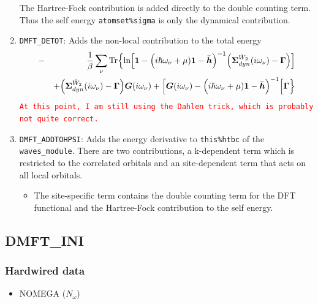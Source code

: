 \documentclass[11pt,a4paper]{report}
\newcommand{\petertt}[1]{\textcolor{red}{\texttt{#1}}}
\begin{document}
\begin{enumerate}
    The Hartree-Fock contribution is added directly to the double
  counting term. Thus the self energy \verb|atomset%sigma| is only
  the dynamical contribution.
%
\item \verb|DMFT_DETOT|: Adds the non-local contribution to the total energy
\begin{eqnarray}
&-&\frac{1}{\beta}\sum_\nu\mathrm{Tr}\Bigl\lbrace
\ln\Bigl[
\bm{1}-
\Bigl(i\hbar\omega_\nu+\mu)\bm{1}-\bar{\bm{h}}\Bigr)^{-1}
\Bigl(
\bm{\Sigma}^{\hat{W}_2}_{dyn}(i\omega_\nu)-\bm{\Gamma}\Bigr)
\Bigr]
\nonumber\\&&
+\Bigl(\bm{\Sigma}^{\hat{W}_2}_{dyn}(i\omega_\nu)
-\bm{\Gamma}\Bigr)\bm{G}(i\omega_\nu)
+
\Bigl[
\bm{G}(i\omega_\nu)
-\Bigl(i\hbar\omega_\nu+\mu)\bm{1}-\bar{\bm{h}}\Bigr)^{-1}
\Bigr[
\bm{\Gamma}\Bigr\rbrace
\end{eqnarray}
\petertt{At this point, I am still using the Dahlen trick, which is
  probably not quite correct.}
%
\item \verb|DMFT_ADDTOHPSI|: Adds the energy derivative to
  \verb|this%htbc| of the \verb|waves_module|. There are two
  contributions, a k-dependent term which is restricted to the
  correlated orbitals and an site-dependent term that acts on all
  local orbitals.
\begin{itemize}
\item The site-specific term contains the double counting term for the
  DFT functional and the Hartree-Fock contribution to the self energy.
\end{itemize}
\end{enumerate}



\subsection{DMFT\_INI}

\subsubsection{Hardwired data}
\begin{itemize}
\item NOMEGA ($N_\omega$)
\end{itemize}
\end{document}
